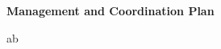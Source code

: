 \documentclass[11pt]{NSFamsart}
\begin{document}

\centerline{\textbf{\Large Management and Coordination Plan}}

\bigskip

ab
\end{document}
